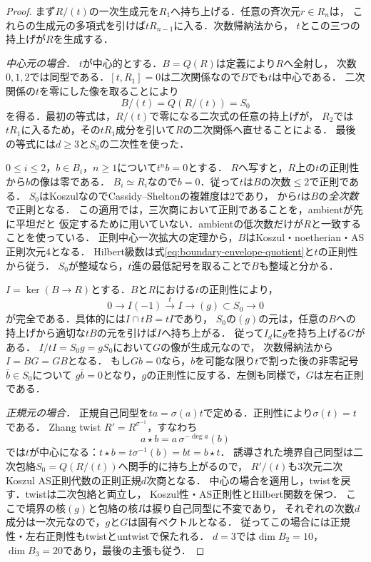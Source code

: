 \documentclass[11pt,a4paper]{ltjsarticle}
\theoremstyle{definition}\newtheorem{definition}[theorem]{定義}
\begin{document}
\begin{proof}
まず$R/(t)$の一次生成元を$R_1$へ持ち上げる．任意の斉次元$r\in R_n$は，
これらの生成元の多項式を引けば$tR_{n-1}$に入る．次数帰納法から，
$t$とこの三つの持上げが$R$を生成する．

\emph{中心元の場合．}
$t$が中心的とする．$B=Q(R)$は定義により$R$へ全射し，
次数$0,1,2$では同型である．$[t,R_1]=0$は二次関係なので$B$でも$t$は中心である．
二次関係の$t$を零にした像を取ることにより
\begin{equation}\label{eq:boundary-envelope-quotient}
 B/(t)=Q(R/(t))=S_0
\end{equation}
を得る．最初の等式は，$R/(t)$で零になる二次式の任意の持上げが，
$R_2$では$tR_1$に入るため，その$tR_1$成分を引いて$R$の二次関係へ直せることによる．
最後の等式には$d\ge3$と$S_0$の二次性を使った．

$0\le i\le2$，$b\in B_i$，$n\ge1$について$t^nb=0$とする．
$R$へ写すと，$R$上の$t$の正則性から$b$の像は零である．
$B_i\simeq R_i$なので$b=0$．従って$t$は$B$の次数$\le2$で正則である．
$S_0$はKoszulなのでCassidy--Sheltonの複雑度は2であり，
\cite[Theorem 1.5]{CS}から$t$は$B$の\emph{全次数}で正則となる．
この適用では，三次商において正則であることを，ambientが先に平坦だと
仮定するために用いていない．ambientの低次数だけが$R$と一致することを使っている．
正則中心一次拡大の定理\cite{LBS}から，$B$はKoszul・noetherian・AS正則次元4となる．
Hilbert級数は式\eqref{eq:boundary-envelope-quotient}と$t$の正則性から従う．
$S_0$が整域なら，$t$進の最低記号を取ることで$B$も整域と分かる．

$I=\ker(B\to R)$とする．$B$と$R$における$t$の正則性により，
\begin{equation}\label{eq:boundary-ideal-reduction}
 0\longrightarrow I(-1)\xrightarrow{t}I
 \longrightarrow (g)\subset S_0\longrightarrow0
\end{equation}
が完全である．具体的には$I\cap tB=tI$であり，
$S_0$の$(g)$の元は，任意の$B$への持上げから適切な$tB$の元を引けば$I$へ持ち上がる．
従って$I_d$に$g$を持ち上げる$G$がある．
$I/tI=S_0g=gS_0$において$G$の像が生成元なので，
次数帰納法から$I=BG=GB$となる．
もし$Gb=0$なら，$b$を可能な限り$t$で割った後の非零記号$\bar b\in S_0$について
$g\bar b=0$となり，$g$の正則性に反する．左側も同様で，$G$は左右正則である．

\emph{正規元の場合．}
正規自己同型を$t a=\sigma(a)t$で定める．正則性により$\sigma(t)=t$である．
Zhang twist $R'=R^{\sigma^{-1}}$，すなわち
\[
 a\star b=a\,\sigma^{-\deg a}(b)
\]
では$t$が中心になる：$t\star b=t\sigma^{-1}(b)=bt=b\star t$．
誘導された境界自己同型は二次包絡$S_0=Q(R/(t))$へ関手的に持ち上がるので，
$R'/(t)$も3次元二次Koszul AS正則代数の正則正規$d$次商となる．
中心の場合を適用し，twistを戻す．twistは二次包絡と両立し，
Koszul性・AS正則性とHilbert関数を保つ\cite{ZhangTwist}．
ここで境界の核$(g)$と包絡の核$I$は捩り自己同型に不変であり，
それぞれの次数$d$成分は一次元なので，$g$と$G$は固有ベクトルとなる．
従ってこの場合には正規性・左右正則性もtwistとuntwistで保たれる．
$d=3$では$\dim B_2=10$，$\dim B_3=20$であり，最後の主張も従う．
\end{proof}
\end{document}
